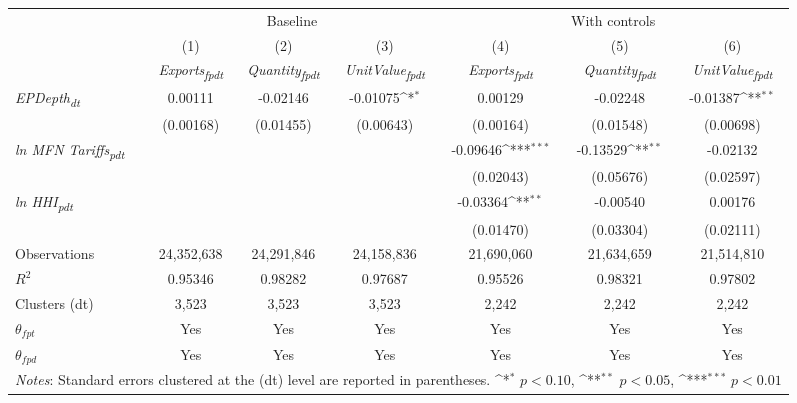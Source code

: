 {
\def\sym#1{\ifmmode^{#1}\else\(^{#1}\)\fi}
\begin{tabular}{l*{6}{c}}
\toprule
&\multicolumn{3}{c}{Baseline}&\multicolumn{3}{c}{With controls}\\\cmidrule(lr){2-4}\cmidrule(lr){5-7}
&(1)&(2)&(3)&(4)&(5)&(6)\\
&\textit{Exports\textsubscript{fpdt}}&\textit{Quantity\textsubscript{fpdt}}&\textit{UnitValue\textsubscript{fpdt}}&\textit{Exports\textsubscript{fpdt}}&\textit{Quantity\textsubscript{fpdt}}&\textit{UnitValue\textsubscript{fpdt}}\\
\midrule
\textit{EPDepth\textsubscript{dt}} & 0.00111 & -0.02146 & -0.01075\sym{*} & 0.00129 & -0.02248 & -0.01387\sym{**}\\
 & (0.00168) & (0.01455) & (0.00643) & (0.00164) & (0.01548) & (0.00698)\\
\addlinespace
\textit{ln MFN Tariffs\textsubscript{pdt}} &  &  &  & -0.09646\sym{***} & -0.13529\sym{**} & -0.02132\\
 &  &  &  & (0.02043) & (0.05676) & (0.02597)\\
\addlinespace
\textit{ln HHI\textsubscript{pdt}} &  &  &  & -0.03364\sym{**} & -0.00540 & 0.00176\\
 &  &  &  & (0.01470) & (0.03304) & (0.02111)\\
\midrule
Observations & 24,352,638 & 24,291,846 & 24,158,836 & 21,690,060 & 21,634,659 & 21,514,810\\
$R^{2}$ & 0.95346 & 0.98282 & 0.97687 & 0.95526 & 0.98321 & 0.97802\\
Clusters (dt) & 3,523 & 3,523 & 3,523 & 2,242 & 2,242 & 2,242\\
$\theta_{fpt}$ & Yes & Yes & Yes & Yes & Yes & Yes\\
$\theta_{fpd}$ & Yes & Yes & Yes & Yes & Yes & Yes\\
\bottomrule
\multicolumn{7}{l}{\footnotesize \textit{Notes}: Standard errors clustered at the (dt) level are reported in parentheses. \sym{*} \(p<0.10\), \sym{**} \(p<0.05\), \sym{***} \(p<0.01\)}\\
\end{tabular}
}
